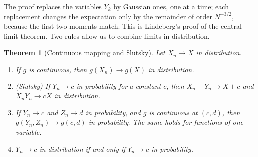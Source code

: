 \documentclass[11pt]{article}
\theoremstyle{definition}
\theoremstyle{plain}
\newtheorem{theorem}[definition]{Theorem}
\theoremstyle{remark}
\begin{document}
The proof replaces the variables $Y_k$ by Gaussian ones, one at a time; each replacement changes the expectation only by the remainder of order $N^{-3/2}$, because the first two moments match. This is Lindeberg's proof of the central limit theorem. Two rules allow us to combine limits in distribution.

\begin{theorem}[Continuous mapping and Slutsky]\label{thm:slutsky}
    Let $X_n \to X$ in distribution.
    \begin{enumerate}
        \item If $g$ is continuous, then $g(X_n) \to g(X)$ in distribution.
        \item (Slutsky) If $Y_n \to c$ in probability for a constant $c$, then $X_n + Y_n \to X + c$ and $X_nY_n \to cX$ in distribution.
        \item If $Y_n \to c$ and $Z_n \to d$ in probability, and $g$ is continuous at $(c, d)$, then $g(Y_n, Z_n) \to g(c, d)$ in probability. The same holds for functions of one variable.
        \item $Y_n \to c$ in distribution if and only if $Y_n \to c$ in probability.
    \end{enumerate}
\end{theorem}
\end{document}
